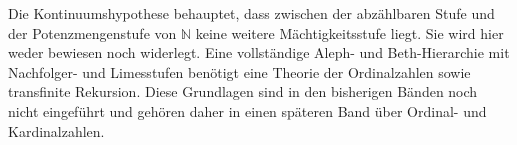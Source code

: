 \documentclass[main.tex]{subfiles}
\begin{document}

\begin{remark}
Die Kontinuumshypothese behauptet, dass zwischen der abzählbaren Stufe und
der Potenzmengenstufe von \(\mathbb N\) keine weitere Mächtigkeitsstufe
liegt. Sie wird hier weder bewiesen noch widerlegt. Eine vollständige
Aleph- und Beth-Hierarchie mit Nachfolger- und Limesstufen benötigt eine
Theorie der Ordinalzahlen sowie transfinite Rekursion. Diese Grundlagen
sind in den bisherigen Bänden noch nicht eingeführt und gehören daher in
einen späteren Band über Ordinal- und Kardinalzahlen.
\end{remark}


\end{document}
